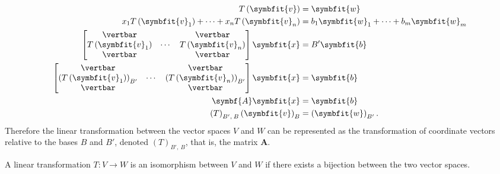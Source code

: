 \documentclass{article}
\begin{document}
\begin{multicols*}{3}
    \begin{align*}
        T\left( \symbfit{v} \right)                                                                                       & = \symbfit{w}                                    \\
        x_1 T\left( \symbfit{v}_1 \right) + \cdots + x_n T\left( \symbfit{v}_n \right)                                    & = b_1 \symbfit{w}_1 + \cdots + b_m \symbfit{w}_m \\
        \begin{bmatrix}
            \vertbar                      &        & \vertbar                      \\
            T\left( \symbfit{v}_1 \right) & \cdots & T\left( \symbfit{v}_n \right) \\
            \vertbar                      &        & \vertbar
        \end{bmatrix} \symbfit{x}                                         & = B' \symbfit{b}                                                                                 \\
        \begin{bmatrix}
            \vertbar                                          &        & \vertbar                                          \\
            \left( T\left( \symbfit{v}_1 \right) \right)_{B'} & \cdots & \left( T\left( \symbfit{v}_n \right) \right)_{B'} \\
            \vertbar                                          &        & \vertbar
        \end{bmatrix} \symbfit{x} & = \symbfit{b}                                                       \\
        \symbf{A} \symbfit{x}                                                                                             & = \symbfit{b}                                    \\
        \left( T \right)_{B',\: B} \left( \symbfit{v} \right)_B                                                           & = \left( \symbfit{w} \right)_{B'}.
    \end{align*}
    Therefore the linear transformation between the vector spaces \(V\) and \(W\)
    can be represented as the transformation of coordinate vectors relative to the bases \(B\) and \(B'\), denoted \(\left( T \right)_{B',\: B}\), that is, the matrix \(\symbf{A}\).
    \begin{definition}[Isomorphism]
        A linear transformation \(T : V \to W\) is an isomorphism between \(V\) and \(W\) if there exists a bijection between the two vector spaces.


\end{definition}
\end{multicols*}
\end{document}
